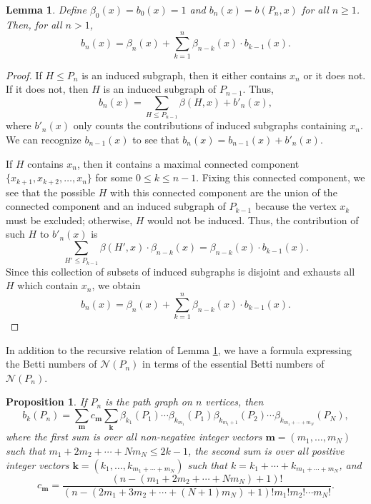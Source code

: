 \documentclass[12pt]{amsart}
\newtheorem{prop}[theorem]{Proposition}
\newtheorem{lem}[theorem]{Lemma}
\theoremstyle{definition}
\begin{document}
\begin{lem}\label{rem:33}
    Define $\beta_{0}(x) = b_{0}(x)= 1$ and $b_n(x)=b(P_n,x)$ for all $n\ge 1$. Then, for all $n >1$, \begin{equation}\label{PoincareBadRecurs} b_{n}(x) = \beta_n(x)+\sum_{k=1}^{n}\beta_{n-k} (x) \cdot b_{k-1}(x).\end{equation}
\end{lem}
\begin{proof}
     If $H \leq P_{n}$ is an induced subgraph, then it either contains $x_n$ or it does not. If it does not, then $H$ is an induced subgraph of $P_{n-1}$. Thus, 
     \[
     b_{n}(x) = \sum_{H \leq P_{n-1}} \beta(H,x)+b'_n(x),
     \]
     where $b'_n(x)$ only counts the contributions of induced subgraphs containing $x_n$. We can recognize $b_{n-1}(x)$ to see that $b_n(x) = b_{n-1}(x)+b'_n(x)$.
     
     If $H$ contains $x_n$, then it contains a maximal connected component $\{x_{k+1},x_{k+2},\dots,x_{n}\}$ for some $0\leq k \leq n-1$. Fixing this connected component, we see that the possible $H$ with this connected component are the union of the connected component and an induced subgraph of $P_{k-1}$ because the vertex $x_k$ must be excluded; otherwise, $H$ would not be induced. Thus, the contribution of such $H$ to $b'_n(x)$ is 
     \[\sum_{H' \leq P_{k-1}} \beta(H',x) \cdot \beta_{n-k}(x) = \beta_{n-k}(x)\cdot b_{k-1}(x).
     \]  
     Since this collection of subsets of induced subgraphs is disjoint and exhausts all $H$ which contain $x_n$, we obtain
     \[
     b_n(x) = \beta_{n}(x) + \sum_{k=1}^n \beta_{n-k}(x) \cdot b_{k-1}(x).
     \]
\end{proof}
In addition to the recursive relation of Lemma \ref{rem:33}, we have a formula expressing the Betti numbers of $\mathcal N(P_n)$ in terms of the essential Betti numbers of $\mathcal N(P_n)$.

\begin{prop}
If $P_n$ is the path graph on $n$ vertices, then
\[b_k(P_n)= \sum_{\mathbf m} c_{\mathbf m} \sum_{\mathbf k} \beta_{k_1}(P_1)\cdots\beta_{k_{m_1}}(P_1)\beta_{k_{m_1+1}}(P_2)\cdots \beta_{k_{m_1+\cdots+m_N}}(P_N),\]
where the first sum is over all non-negative integer vectors $\mathbf m=(m_1,\ldots,m_N)$ such that $m_1+2m_2+\cdots+Nm_N\le 2k-1$, the second sum is over all positive integer vectors $\mathbf k=(k_1,\ldots,k_{m_1+\cdots+m_N})$ such that $k=k_1+\cdots+k_{m_1+\cdots+m_N}$, and
\[c_{\mathbf m}= \frac{(n-(m_1+2m_2+\cdots+Nm_N)+1)!}{(n-(2m_1+3m_2+\cdots+(N+1)m_N)+1)!m_1!m_2!\cdots m_N!}.\]
\end{prop}
\end{document}
